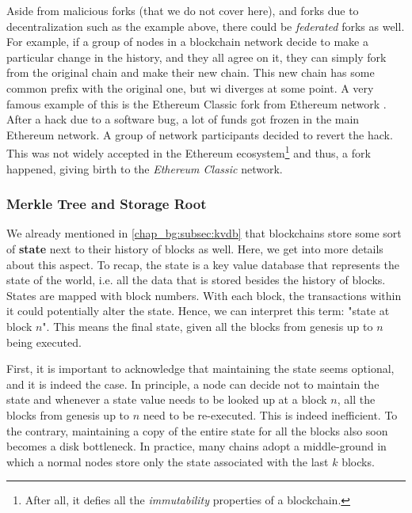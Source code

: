 Aside from malicious forks (that we do not cover here), and forks due to decentralization such as
the example above, there could be \textit{federated} forks as well. For example, if a group of nodes
in a blockchain network decide to make a particular change in the history, and they all agree on it,
they can simply fork from the original chain and make their new chain. This new chain has some
common prefix with the original one, but wi diverges at some point. A very famous example of this is
the Ethereum Classic fork from Ethereum network \cite{vignaGreatDigitalCurrencyDebate2016}. After a
hack due to a software bug, a lot of funds got frozen in the main Ethereum network. A group of
network participants decided to revert the hack. This was not widely accepted in the Ethereum
ecosystem\footnote{After all, it defies all the \textit{immutability} properties of a blockchain.}
and thus, a fork happened, giving birth to the \textit{Ethereum Classic} network.



\subsubsection{Merkle Tree and Storage Root} \label{chap_bg:subsec:trie}

We already mentioned in \ref{chap_bg:subsec:kvdb} that blockchains store some sort of \textbf{state}
next to their history of blocks as well. Here, we get into more details about this aspect. To recap,
the state is a key value database that represents the state of the world, i.e. all the data that is
stored besides the history of blocks. States are mapped with block numbers. With each block, the
transactions within it could potentially alter the state. Hence, we can interpret this term: "state
at block $n$". This means the final state, given all the blocks from genesis up to $n$ being
executed.

First, it is important to acknowledge that maintaining the state seems optional, and it is indeed
the case. In principle, a node can decide not to maintain the state and whenever a state value needs
to be looked up at a block $n$, all the blocks from genesis up to $n$ need to be re-executed. This
is indeed inefficient. To the contrary, maintaining a copy of the entire state for all the blocks
also soon becomes a disk bottleneck. In practice, many chains adopt a middle-ground in which a
normal nodes store only the state associated with the last $k$ blocks.

